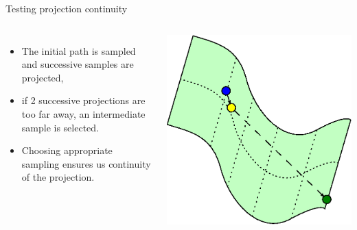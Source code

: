 \begin {frame} {Testing projection continuity}
  \begin{columns}
    \centering
    \begin {itemize}
      \item The initial path is sampled and successive samples are projected,
      \item {\color {white} if 2 successive projections are too far away, an intermediate sample is selected.}
      \item {\color {white} Choosing appropriate sampling ensures us continuity of the projection.}
    \end {itemize}
    \begin {center}
      \includegraphics [width=.9\linewidth] {figures/progressive_1.eps}
    \end {center}
  \end {columns}
\end {frame}

%
%

